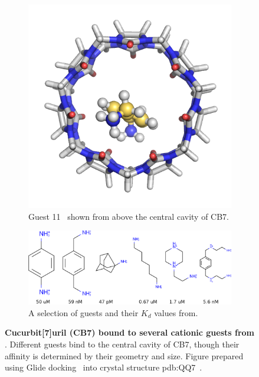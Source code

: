 \documentclass[10pt,final]{article}
\begin{document}
\begin{figure}
\centering
\begin{subfigure}{.5\textwidth}
  \centering
  \includegraphics[width=.4\linewidth]{figures/guest11_top.png}
  \caption{Guest 11~\cite{Cao2013a} shown from above the central cavity of CB7.}
  \label{fig:sub1}
\end{subfigure}%
\begin{subfigure}{.5\textwidth}
  \centering
  \includegraphics[width=0.95\linewidth]{figures/Kd_guest.png}  
  \caption{A selection of guests and their $K_d$ values from\textcite{Cao2013a}.}
  \label{fig:sub2}
\end{subfigure}
\caption{\textbf{Cucurbit[7]uril (CB7) bound to several cationic guests from \textcite{Cao2013a}}. Different guests bind to the central cavity of CB7, though their affinity is determined by their geometry and size. Figure prepared using Glide docking~\cite{Halgren2004a,Friesner2004a,Friesner2006a,Schroedinger2014a} into crystal structure pdb:QQ7~\cite{Feng2004a}.}
\label{figure:host-guest}
\end{figure}
\end{document}
